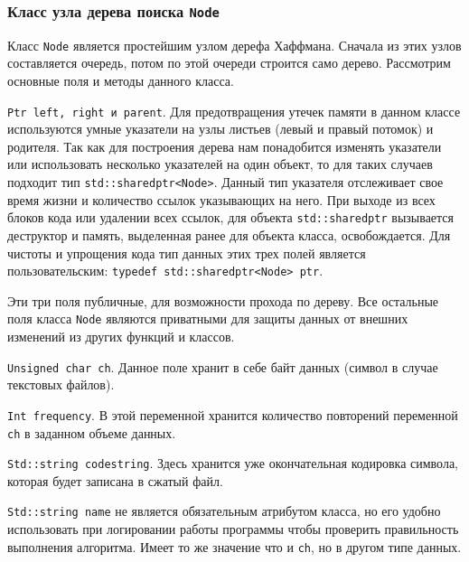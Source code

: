 \subsubsection{Класс узла дерева поиска \texttt{Node}}


Класс \texttt{Node} является простейшим узлом дерефа Хаффмана.
Сначала из этих узлов составляется очередь\cite{queue}, потом по этой очереди строится само дерево.
Рассмотрим основные поля и методы данного класса.



\texttt{Ptr left, right и parent}.
Для предотвращения утечек памяти в данном классе используются умные указатели на узлы листьев (левый и правый потомок) и родителя.
Так как для построения дерева нам понадобится изменять указатели или использовать несколько указателей на один объект, то для таких случаев подходит тип \texttt{std::shared{\textunderscore}ptr<Node>}.
Данный тип указателя отслеживает свое время жизни и количество ссылок указывающих на него.
При выходе из всех блоков кода или удалении всех ссылок, для объекта \texttt{std::shared{\textunderscore}ptr}\cite{ptr} вызывается деструктор и память, выделенная ранее для объекта класса, освобождается.
Для чистоты и упрощения кода тип данных этих трех полей является пользовательским: \texttt{typedef std::shared{\textunderscore}ptr<Node> ptr}\cite{lucik}.



Эти три поля публичные, для возможности прохода по дереву.
Все остальные поля класса \texttt{Node} являются приватными\cite{lucik} для защиты данных от внешних изменений из других функций и классов.



\texttt{Unsigned char ch}. 
Данное поле хранит в себе байт данных (символ в случае текстовых файлов).



\texttt{Int frequency}.
В этой переменной хранится количество повторений переменной \texttt{ch} в заданном объеме данных.



\texttt{Std::string code{\textunderscore}string}. 
Здесь хранится уже окончательная кодировка символа, которая будет записана в сжатый файл.



\texttt{Std::string name} не является обязательным атрибутом класса, но его удобно использовать при логировании работы программы чтобы проверить правильность выполнения алгоритма.
Имеет то же значение что и \texttt{ch}, но в другом типе данных.



